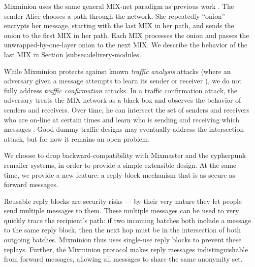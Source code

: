 \documentclass{llncs}
\begin{document}
Mixminion uses the same general MIX-net paradigm as previous work
\cite{chaum-mix, mixmaster-attacks, others}. The sender Alice chooses
a path through the network.
She repeatedly ``onion'' encrypts her message, starting with the last
MIX in her path, and sends the onion to the first MIX in her path. Each
MIX processes the onion and passes the unwrapped-by-one-layer onion to
the next MIX. We describe the behavior of the last MIX in
Section \ref{subsec:delivery-modules}.

While Mixminion protects against known \emph{traffic analysis} attacks
(where an adversary given a message attempts to learn its sender or
receiver \cite{jfraymond, simon}), we do not fully address \emph{traffic
confirmation} attacks. In a traffic confirmation attack, the adversary
treats the MIX network as a black box and observes the behavior of
senders and receivers. Over time, he can intersect the set of senders
and receivers who are on-line at certain times and learn who is sending
and receiving which messages \cite{langos02}. Good dummy traffic designs
may eventually address the intersection attack, but for now it remains
an open problem.

We choose to drop backward-compatibility with Mixmaster and the cypherpunk
remailer systems, in order to provide a simple extensible design. At
the same time, we provide a new feature: a reply block mechanism that
is as secure as forward messages.

Reusable reply blocks are security risks --- by their very nature they
let people send multiple messages to them. These multiple messages can be
used to very quickly trace the recipient's path: if two incoming batches
both include a message to the same reply block, then the next hop must
be in the intersection of both outgoing batches. Mixminion thus uses
single-use reply blocks to prevent these replays. Further, the Mixminion
protocol makes reply messages indistinguishable from forward messages,
allowing all messages to share the same anonymity set.

\end{document}
